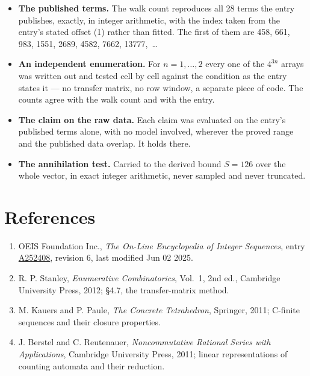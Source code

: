 \documentclass[11pt]{article}
\theoremstyle{definition}
\begin{document}
\begin{itemize}

\item {\bfseries The published terms.} The walk count reproduces all 28 terms the entry publishes, exactly, in integer arithmetic, with the index taken from the entry's stated offset (1) rather than fitted. The first of them are 458, 661, 983, 1551, 2689, 4582, 7662, 13777,~\dots

\item {\bfseries An independent enumeration.} For $n = 1,\dots,2$ every one of the $4^{3n}$ arrays was written out and tested cell by cell against the condition as the entry states it --- no transfer matrix, no row window, a separate piece of code. The counts agree with the walk count and with the entry.

\item {\bfseries The claim on the raw data.} Each claim was evaluated on the entry's published terms alone, with no model involved, wherever the proved range and the published data overlap. It holds there.

\item {\bfseries The annihilation test.} Carried to the derived bound $S = 126$ over the whole vector, in exact integer arithmetic, never sampled and never truncated.

\end{itemize}

\section{References}

\begin{enumerate}

\item OEIS Foundation Inc., \emph{The On-Line Encyclopedia of Integer Sequences}, entry \href{https://oeis.org/A252408}{A252408}, revision 6, last modified Jun 02 2025.

\item R. P. Stanley, \emph{Enumerative Combinatorics}, Vol.~1, 2nd ed., Cambridge University Press, 2012; \S4.7, the transfer-matrix method.

\item M. Kauers and P. Paule, \emph{The Concrete Tetrahedron}, Springer, 2011; C-finite sequences and their closure properties.

\item J. Berstel and C. Reutenauer, \emph{Noncommutative Rational Series with Applications}, Cambridge University Press, 2011; linear representations of counting automata and their reduction.

\end{enumerate}
\end{document}
